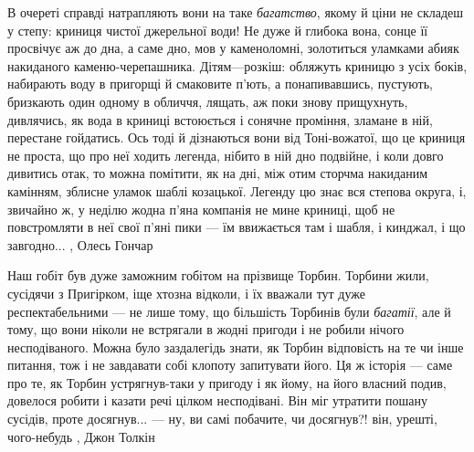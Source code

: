 В очереті справді натрапляють вони на таке \emph{багатство}, якому й ціни не складеш у
степу: криниця чистої джерельної води! Не дуже й глибока вона, сонце її
просвічує аж до дна, а саме дно, мов у каменоломні, золотиться уламками абияк
накиданого каменю-черепашника. Дітям—розкіш: обляжуть криницю з усіх боків,
набирають воду в пригорщі й смаковите п'ють, а понапивавшись, пустують,
бризкають один одному в обличчя, лящать, аж поки знову прищухнуть, дивлячись,
як вода в криниці встоюється і сонячне проміння, зламане в ній, перестане
гойдатись. Ось тоді й дізнаються вони від Тоні-вожатої, що це криниця не
проста, що про неї ходить легенда, нібито в ній дно подвійне, і коли довго
дивитись отак, то можна помітити, як на дні, між отим сторчма накиданим
камінням, зблисне уламок шаблі козацької. Легенду цю знає вся степова округа,
і, звичайно ж, у неділю жодна п'яна компанія не мине криниці, щоб не
повстромляти в неї свої п'яні пики — їм ввижається там і шабля, і кинджал, і що
завгодно...
, Олесь Гончар

Наш гобіт був дуже заможним гобітом на прізвище Торбин. Торбини жили, сусідячи
з Пригірком, іще хтозна відколи, і їх вважали тут дуже респектабельними — не
лише тому, що більшість Торбинів були \emph{багатії}, але й тому, що вони ніколи не
встрягали в жодні пригоди і не робили нічого несподіваного. Можна було
заздалегідь знати, як Торбин відповість на те чи інше питання, тож і не
завдавати собі клопоту запитувати його. Ця ж історія — саме про те, як Торбин
устрягнув-таки у пригоду і як йому, на його власний подив, довелося робити і
казати речі цілком несподівані. Він міг утратити пошану сусідів, проте
досягнув... — ну, ви самі побачите, чи досягнув?! він, урешті, чого-небудь
, Джон Толкін
